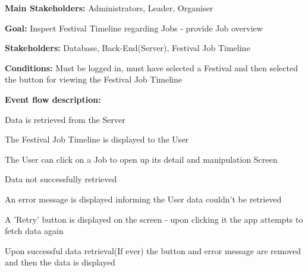 			\noindent {}
			\begin{packed_item}
				\item \textbf{Main Stakeholders:} Administrators, Leader, Organiser
				\item \textbf{Goal:} Inspect Festival Timeline regarding Jobs - provide Job overview
				\item \textbf{Stakeholders: } Database, Back-End(Server), Festival Job Timeline
				\item \textbf{Conditions: } Must be logged in, must have selected a Festival and then selected the button for viewing the Festival Job Timeline
				\item \textbf{Event flow description: }
				\begin{packed_enum}
					\item Data is retrieved from the Server
					\item The Festival Job Timeline is displayed to the User
					\item The User can click on a Job to open up its detail and manipulation Screen
				\end{packed_enum}
				
				\begin{packed_item}
					\item[1.a] Data not successfully retrieved
					\item[] \begin{packed_enum}
						\item An error message is displayed informing the User data couldn't be retrieved
						\item A 'Retry' button is displayed on the screen - upon clicking it the app attempts to fetch data again
						\item Upon successful data retrieval(If ever) the button and error message are removed and then the data is displayed
					\end{packed_enum}
				\end{packed_item}
			\end{packed_item}
		

